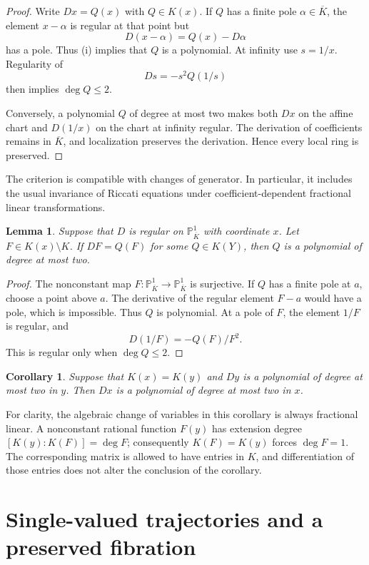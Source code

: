 \documentclass[11pt,reqno]{amsart}
\numberwithin{equation}{section}
\newtheorem{lemma}[theorem]{Lemma}
\newtheorem{corollary}[theorem]{Corollary}
\theoremstyle{definition}
\theoremstyle{remark}
\newcommand{\PP}{\mathbb P}
\begin{document}
\begin{proof}
Write $Dx=Q(x)$ with $Q\in K(x)$. If $Q$ has a finite pole
$\alpha\in\overline K$, the element $x-\alpha$ is regular at that point
but
\[
 D(x-\alpha)=Q(x)-D\alpha
\]
has a pole. Thus (i) implies that $Q$ is a polynomial. At infinity use
$s=1/x$. Regularity of
\[
 Ds=-s^2Q(1/s)
\]
then implies $\deg Q\leq2$.

Conversely, a polynomial $Q$ of degree at most two makes both $Dx$ on
the affine chart and $D(1/x)$ on the chart at infinity regular. The
derivation of coefficients remains in $\overline K$, and localization
preserves the derivation. Hence every local ring is preserved.
\end{proof}

The criterion is compatible with changes of generator. In particular,
it includes the usual invariance of Riccati equations under
coefficient-dependent fractional linear transformations.

\begin{lemma}
\label{lem:rational-image}
Suppose that $D$ is regular on $\PP^1_{\overline K}$ with coordinate
$x$. Let $F\in K(x)\setminus K$. If $DF=Q(F)$ for some $Q\in K(Y)$,
then $Q$ is a polynomial of degree at most two.
\end{lemma}

\begin{proof}
The nonconstant map $F:\PP^1_{\overline K}\to\PP^1_{\overline K}$
is surjective. If $Q$ has a finite pole at $a$, choose a point above
$a$. The derivative of the regular element $F-a$ would have a pole,
which is impossible. Thus $Q$ is polynomial. At a pole of $F$, the
element $1/F$ is regular, and
\[
 D(1/F)=-Q(F)/F^2.
\]
This is regular only when $\deg Q\leq2$.
\end{proof}

\begin{corollary}
\label{cor:change-generator}
Suppose that $K(x)=K(y)$ and $Dy$ is a polynomial of degree at most two
in $y$. Then $Dx$ is a polynomial of degree at most two in $x$.
\end{corollary}

For clarity, the algebraic change of variables in this corollary is
always fractional linear. A nonconstant rational function $F(y)$ has
extension degree $[K(y):K(F)]=\deg F$; consequently $K(F)=K(y)$ forces
$\deg F=1$. The corresponding matrix is allowed to have entries in
$K$, and differentiation of those entries does not alter the conclusion
of the corollary.

\section{Single-valued trajectories and a preserved fibration}
\label{sec:guillot}
\end{document}
